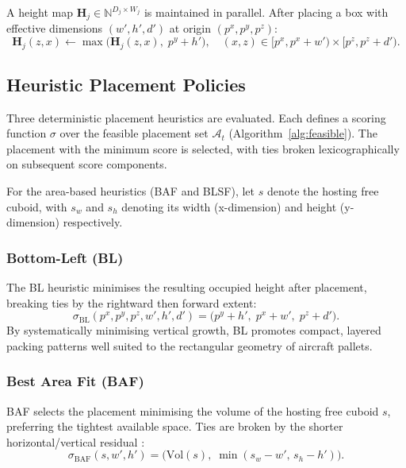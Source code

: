 \documentclass[12pt,a4paper]{article}
\begin{document}
A height map $\mathbf{H}_j \in \mathbb{N}^{D_j \times W_j}$ is
maintained in parallel.
After placing a box with effective dimensions $(w', h', d')$ at
origin $(p^x, p^y, p^z)$:
\begin{equation}
\label{eq:hmap}
\mathbf{H}_j(z, x) \leftarrow
\max\!\bigl(\mathbf{H}_j(z, x),\; p^y + h'\bigr),\quad
(x,z)\in[p^x,p^x\!+\!w')\times[p^z,p^z\!+\!d').
\end{equation}

\subsection{Heuristic Placement Policies}
\label{sec:heuristics}

Three deterministic placement heuristics are evaluated.
Each defines a scoring function $\sigma$ over the feasible placement
set $\mathcal{A}_t$ (Algorithm~\ref{alg:feasible}).
The placement with the minimum score is selected, with ties broken
lexicographically on subsequent score components.

For the area-based heuristics (BAF and BLSF), let $s$ denote the
hosting free cuboid, with $s_w$ and $s_h$ denoting its width
(x-dimension) and height (y-dimension) respectively.

\subsubsection{Bottom-Left (BL)}

The BL heuristic \citep{Chazelle1983} minimises the resulting occupied
height after placement, breaking ties by the rightward then forward
extent:
\begin{equation}
\label{eq:bl}
\sigma_{\mathrm{BL}}(p^x, p^y, p^z, w', h', d')
= \bigl(p^y + h',\; p^x + w',\; p^z + d'\bigr).
\end{equation}
By systematically minimising vertical growth, BL promotes compact,
layered packing patterns well suited to the rectangular geometry of
aircraft pallets.

\subsubsection{Best Area Fit (BAF)}

BAF selects the placement minimising the volume of the hosting free
cuboid $s$, preferring the tightest available space.
Ties are broken by the shorter horizontal/vertical residual
\citep{Tsang2025}:
\begin{equation}
\label{eq:baf}
\sigma_{\mathrm{BAF}}(s, w', h')
= \bigl(\mathrm{Vol}(s),\; \min(s_w - w',\, s_h - h')\bigr).
\end{equation}
\end{document}

